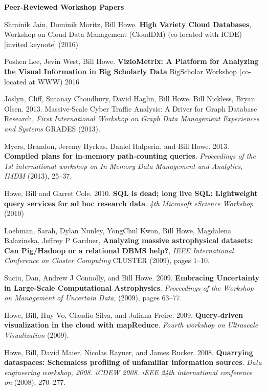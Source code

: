 {\bf Peer-Reviewed Workshop Papers}
\begin{bulletlist}

\item  Shrainik Jain, Dominik Moritz, Bill Howe. \textbf{High Variety Cloud Databases},  
Workshop on Cloud Data Management (CloudDM) (co-located with ICDE) [invited keynote] (2016)

\item Poshen Lee, Jevin West, Bill Howe. 
\textbf{VizioMetrix: A Platform for Analyzing the Visual Information in Big Scholarly Data}
BigScholar Workshop (co-located at WWW) 2016

\item Joslyn, Cliff, Sutanay Choudhury, David Haglin, Bill Howe, Bill Nickless, Bryan Olsen. 2013. Massive-Scale Cyber Traffic Analysis: A Driver for Graph Database Research,
\emph{First International Workshop on Graph Data Management Experiences and Systems} GRADES (2013).

\item Myers, Brandon, Jeremy Hyrkas, Daniel Halperin, and Bill
Howe. 2013. \textbf{Compiled plans for in-memory path-counting queries}.
\emph{Proceedings of the 1st international workshop on In Memory Data
Management and Analytics, IMDM} (2013), 25--37. 

\item Howe, Bill and Garret Cole. 2010. 
\textbf{SQL is dead; long live SQL: Lightweight query services for ad hoc research data}.
\emph{4th Microsoft eScience Workshop} (2010)

\item Loebman, Sarah, Dylan Nunley, YongChul Kwon, Bill Howe, Magdalena Balazinska, Jeffrey P Gardner, \textbf{Analyzing massive astrophysical datasets: Can Pig/Hadoop or a relational DBMS help?}, 
\emph{IEEE International Conference on Cluster Computing} CLUSTER (2009), pages 1--10.

\item Suciu, Dan, Andrew J Connolly, and Bill Howe. 2009. 
\textbf{Embracing Uncertainty in Large-Scale Computational Astrophysics}.
\emph{Proceedings of the Workshop on Management of Uncertain Data}, (2009),
  pages 63--77.

\item Howe, Bill, Huy Vo, Claudio Silva, and Juliana
Freire. 2009. \textbf{Query-driven visualization in the cloud with mapReduce}.
\emph{Fourth workshop on Ultrascale Visualization} (2009). 

\item Howe, Bill, David Maier, Nicolas Rayner, and James
Rucker. 2008. \textbf{Quarrying dataspaces: Schemaless profiling of unfamiliar
information sources}. \emph{Data engineering workshop, 2008. iCDEW 2008.
iEEE 24th international conference on} (2008), 270--277. 


\end{bulletlist}
